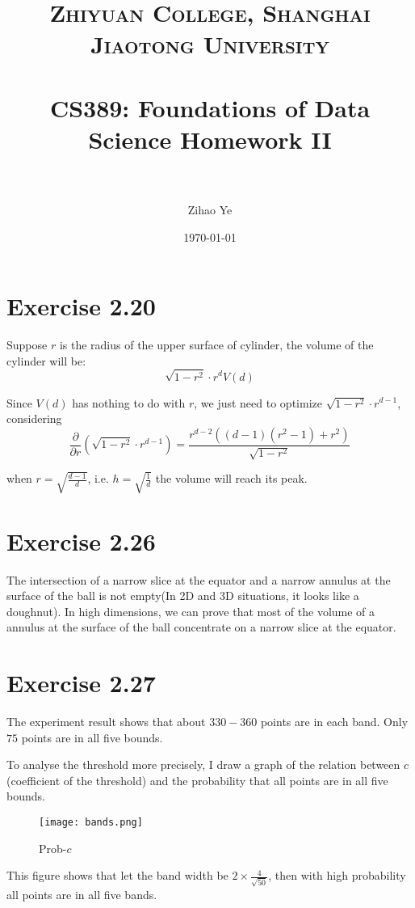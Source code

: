 \documentclass[paper=a4, fontsize=11pt]{scrartcl} %
\title{	
\normalfont \normalsize 
\textsc{Zhiyuan College, Shanghai Jiaotong University} \\ %
\horrule{0.5pt} \\[0.4cm] %
\huge CS389: Foundations of Data Science Homework II\\ %
\horrule{2pt} \\ %
}
\author{Zihao Ye} %
\date{\normalsize\today} %
\numberwithin{equation}{section} %
\numberwithin{figure}{section} %
\numberwithin{table}{section} %
\begin{document}
\maketitle %

\section*{Exercise 2.20}
Suppose $r$ is the radius of the upper surface of cylinder, the volume of the cylinder will be:
$$\sqrt{1 - r^2}\cdot r^d V(d) $$

Since $V(d)$ has nothing to do with $r$, we just need to optimize $\sqrt{1 - r^2}\cdot r^{d-1}$, considering
$$\frac{\partial}{\partial r} \left( \sqrt{1-r^2}\cdot r^{d-1}\right) = \frac{r^{d-2}\left((d - 1)(r^2 - 1) + r^2\right)}{\sqrt{1-r^2}} $$

when $r = \sqrt{\frac{d - 1}{d}}$, i.e. $h = \sqrt{\frac{1}{d}}$ the volume will reach its peak.
\section*{Exercise 2.26}
The intersection of a narrow slice at the equator and a narrow annulus at the surface of the ball is not empty(In 2D and 3D situations, it looks like a doughnut). In high dimensions, we can prove that most of the volume of a annulus at the surface of the ball concentrate on a narrow slice at the equator.
\section*{Exercise 2.27}
The experiment result shows that about $330-360$ points are in each band. Only $75$ points are in all five bounds.

To analyse the threshold more precisely, I draw a graph of the relation between $c$(coefficient of the threshold) and the probability that all points are in all five bounds.

\begin{figure}[!htb]
\centering
\texttt{[image: bands.png]}
\caption{Prob-$c$}
\end{figure}

This figure shows that let the band width be $2 \times \frac{4}{\sqrt{50}}$, then with high probability all points are in all five bands.
\end{document}
